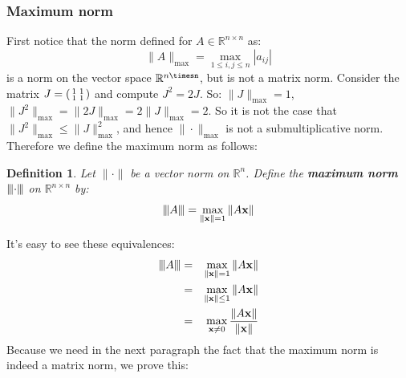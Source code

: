 \documentclass[a4paper,11pt]{report}
\newtheorem{definition}[theorem]{Definition}
\newcommand{\maxnorm}[1]{{\left\vert\kern-0.25ex\left\vert\kern-0.25ex\left\vert #1 
    \right\vert\kern-0.25ex\right\vert\kern-0.25ex\right\vert}}
\newcommand{\R}{{\mathbb R}}
\begin{document}
\subsubsection{Maximum norm}
First notice that the norm defined for $A \in \R^{n\times n}$ as:
$$\|A\|_{\max} = \max_{1\leq i, j \leq n} |a_{ij}|$$
is a norm on the vector space $\R^{n\timesn}$, but is not a matrix norm. Consider the
matrix $J = \begin{psmallmatrix}1 & 1\\ 1 & 1\end{psmallmatrix}$ and compute $J^2 = 2J$. So:
$\|J\|_{\max} = 1$, $\|J^2\|_{\max} = \|2J\|_{\max} = 2\|J\|_{\max} = 2$. So it is not the case that $\|J^2\|_{\max} \leq \|J\|_{\max}^2$, and hence
$\|\cdot\|_{\max}$ is not a submultiplicative norm. Therefore we define the 
maximum norm as follows:
\begin{definition}
  Let $\|\cdot\|$ be a vector norm on $\R^n$. Define the \textbf{maximum norm} $\maxnorm{\cdot}$ on 
  $\R^{n\times n}$ by:
  $$\maxnorm{A} = \max_{\|\mathbf{x}\| = 1} \|A\mathbf{x}\|$$
  \end{definition}
It's easy to see these equivalences:
\begin{eqnarray*}
\maxnorm{A} &=& \max_{\|\mathbf{x}\|= 1} \|A\mathbf{x}\|\\
&=& \max_{\|\mathbf{x}\| \leq 1} \|A\mathbf{x}\|\\
  &=& \max_{\mathbf{x}\not = 0} \frac{\|A\mathbf{x}\|}{\|\mathbf{x}\|}\\
\end{eqnarray*}
Because we need in the next paragraph the fact that the maximum norm is indeed a 
matrix norm, we prove this:
\end{document}
